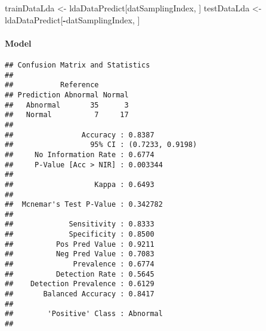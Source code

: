 \documentclass[
]{article}
\newenvironment{Shaded}{\begin{snugshade}}{\end{snugshade}}
\newcommand{\DataTypeTok}[1]{\textcolor[rgb]{0.13,0.29,0.53}{#1}}
\newcommand{\DecValTok}[1]{\textcolor[rgb]{0.00,0.00,0.81}{#1}}
\newcommand{\KeywordTok}[1]{\textcolor[rgb]{0.13,0.29,0.53}{\textbf{#1}}}
\newcommand{\NormalTok}[1]{#1}
\newcommand{\OperatorTok}[1]{\textcolor[rgb]{0.81,0.36,0.00}{\textbf{#1}}}
\newcommand{\OtherTok}[1]{\textcolor[rgb]{0.56,0.35,0.01}{#1}}
\newcommand{\StringTok}[1]{\textcolor[rgb]{0.31,0.60,0.02}{#1}}
\begin{document}
\begin{Shaded}
\begin{Highlighting}[]
\NormalTok{trainDataLda <-}\StringTok{ }\NormalTok{ldaDataPredict[datSamplingIndex, ]}
\NormalTok{testDataLda <-}\StringTok{ }\NormalTok{ldaDataPredict[}\OperatorTok{-}\NormalTok{datSamplingIndex, ]}
\end{Highlighting}
\end{Shaded}

\hypertarget{model}{%
\paragraph{Model}\label{model}}

\begin{Shaded}
\end{Shaded}

\begin{verbatim}
## Confusion Matrix and Statistics
## 
##           Reference
## Prediction Abnormal Normal
##   Abnormal       35      3
##   Normal          7     17
##                                           
##                Accuracy : 0.8387          
##                  95% CI : (0.7233, 0.9198)
##     No Information Rate : 0.6774          
##     P-Value [Acc > NIR] : 0.003344        
##                                           
##                   Kappa : 0.6493          
##                                           
##  Mcnemar's Test P-Value : 0.342782        
##                                           
##             Sensitivity : 0.8333          
##             Specificity : 0.8500          
##          Pos Pred Value : 0.9211          
##          Neg Pred Value : 0.7083          
##              Prevalence : 0.6774          
##          Detection Rate : 0.5645          
##    Detection Prevalence : 0.6129          
##       Balanced Accuracy : 0.8417          
##                                           
##        'Positive' Class : Abnormal        
## 
\end{verbatim}
\end{document}
